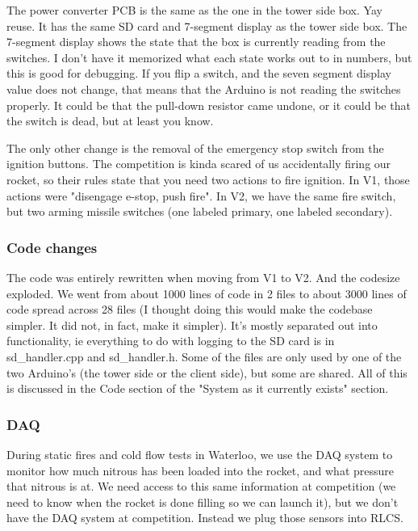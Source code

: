 \documentclass[11pt]{article}
\begin{document}
The power converter PCB is the same as the one in the tower side box. Yay
reuse. It has the same SD card and 7-segment display as the tower side box. The
7-segment display shows the state that the box is currently reading from the
switches. I don't have it memorized what each state works out to in numbers, but
this is good for debugging. If you flip a switch, and the seven segment display
value does not change, that means that the Arduino is not reading the switches
properly. It could be that the pull-down resistor came undone, or it could be
that the switch is dead, but at least you know.

The only other change is the removal of the emergency stop switch from the
ignition buttons. The competition is kinda scared of us accidentally firing our
rocket, so their rules state that you need two actions to fire ignition. In V1,
those actions were "disengage e-stop, push fire". In V2, we have the same fire
switch, but two arming missile switches (one labeled primary, one labeled
secondary). 

\subsubsection{Code changes}
\label{sec:orgf9e9c09}

The code was entirely rewritten when moving from V1 to V2. And the codesize
exploded. We went from about 1000 lines of code in 2 files to about 3000 lines
of code spread across 28 files (I thought doing this would make the codebase
simpler. It did not, in fact, make it simpler). It's mostly separated out into
functionality, ie everything to do with logging to the SD card is in
sd\_handler.cpp and sd\_handler.h. Some of the files are only used by one of the
two Arduino's (the tower side or the client side), but some are shared. All of
this is discussed in the Code section of the "System as it currently exists"
section.

\subsubsection{DAQ}
\label{sec:orgb6d947a}

During static fires and cold flow tests in Waterloo, we use the DAQ system to
monitor how much nitrous has been loaded into the rocket, and what pressure that
nitrous is at. We need access to this same information at competition (we need
to know when the rocket is done filling so we can launch it), but we don't have
the DAQ system at competition. Instead we plug those sensors into RLCS.
\end{document}
